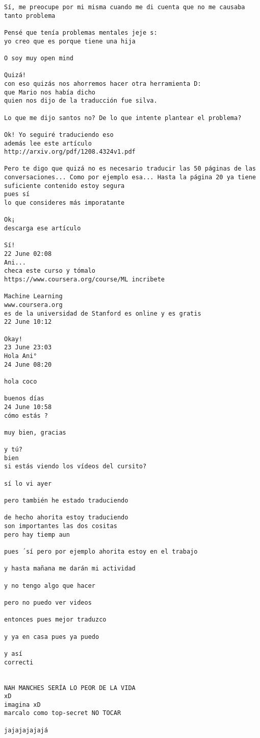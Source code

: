\begin{verbatim}
Sí, me preocupe por mi misma cuando me di cuenta que no me causaba tanto problema

Pensé que tenía problemas mentales jeje s:
yo creo que es porque tiene una hija

O soy muy open mind

Quizá!
con eso quizás nos ahorremos hacer otra herramienta D:
que Mario nos había dicho
quien nos dijo de la traducción fue silva.

Lo que me dijo santos no? De lo que intente plantear el problema?

Ok! Yo seguiré traduciendo eso
además lee este artículo
http://arxiv.org/pdf/1208.4324v1.pdf

Pero te digo que quizá no es necesario traducir las 50 páginas de las conversaciones... Como por ejemplo esa... Hasta la página 20 ya tiene suficiente contenido estoy segura
pues sí
lo que consideres más imporatante

Ok¡
descarga ese artículo

Sí!
22 June 02:08
Ani...
checa este curso y tómalo 
https://www.coursera.org/course/ML incribete

Machine Learning
www.coursera.org
es de la universidad de Stanford es online y es gratis
22 June 10:12

Okay!
23 June 23:03
Hola Ani°
24 June 08:20

hola coco

buenos días 
24 June 10:58
cómo estás ? 

muy bien, gracias

y tú? 
bien 
si estás viendo los vídeos del cursito?

sí lo vi ayer 

pero también he estado traduciendo

de hecho ahorita estoy traduciendo
son importantes las dos cositas 
pero hay tiemp aun 

pues ´sí pero por ejemplo ahorita estoy en el trabajo

y hasta mañana me darán mi actividad

y no tengo algo que hacer

pero no puedo ver videos

entonces pues mejor traduzco

y ya en casa pues ya puedo

y así
correcti


NAH MANCHES SERÍA LO PEOR DE LA VIDA
xD
imagina xD
marcalo como top-secret NO TOCAR

jajajajajajá


\end{verbatim}
